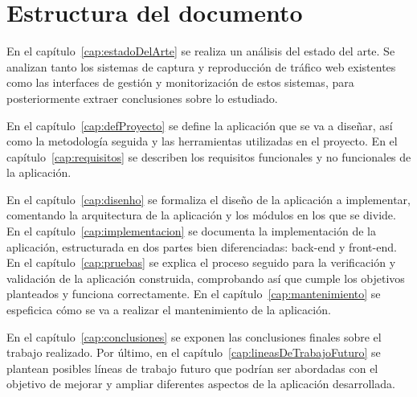 \section{Estructura del documento}

En el capítulo~\ref{cap:estadoDelArte} se realiza un análisis del estado del arte.
Se analizan tanto los sistemas de captura y reproducción de tráfico web existentes como las interfaces de gestión y monitorización de estos sistemas, para posteriormente extraer conclusiones sobre lo estudiado.

En el capítulo~\ref{cap:defProyecto} se define la aplicación que se va a diseñar, así como la metodología seguida y las herramientas utilizadas en el proyecto.
En el capítulo~\ref{cap:requisitos} se describen los requisitos funcionales y no funcionales de la aplicación.

En el capítulo~\ref{cap:disenho} se formaliza el diseño de la aplicación a implementar, comentando la arquitectura de la aplicación y los módulos en los que se divide.
En el capítulo~\ref{cap:implementacion} se documenta la implementación de la aplicación, estructurada en dos partes bien diferenciadas: \gls{back-end} y \gls{front-end}.
En el capítulo~\ref{cap:pruebas} se explica el proceso seguido para la verificación y validación de la aplicación construida, comprobando así que cumple los objetivos planteados y funciona correctamente.
En el capítulo~\ref{cap:mantenimiento} se espeficica cómo se va a realizar el mantenimiento de la aplicación.

En el capítulo~\ref{cap:conclusiones} se exponen las conclusiones finales sobre el trabajo realizado.
Por último, en el capítulo~\ref{cap:lineasDeTrabajoFuturo} se plantean posibles líneas de trabajo futuro que podrían ser abordadas con el objetivo de mejorar y ampliar diferentes aspectos de la aplicación desarrollada.
